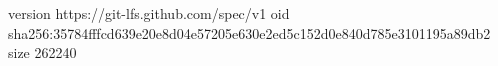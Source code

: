 version https://git-lfs.github.com/spec/v1
oid sha256:35784fffcd639e20e8d04e57205e630e2ed5c152d0e840d785e3101195a89db2
size 262240

